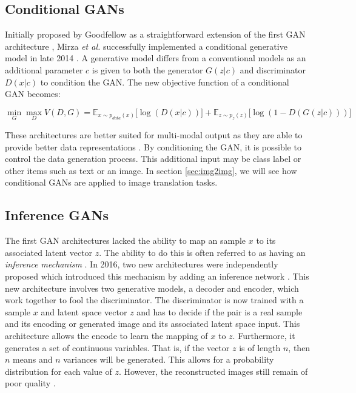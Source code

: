\documentclass[11pt]{article}
\begin{document}
\subsection{Conditional GANs} \label{sec:condgan}
Initially proposed by Goodfellow as a straightforward extension of the first GAN architecture \citep{2014arXiv1406.2661G}, Mirza \textit{et al.} successfully implemented a conditional generative model in late 2014 \citep{2014arXiv1411.1784M}. A generative model differs from a conventional models as an additional parameter $c$ is given to both the generator $G(z|c)$ and discriminator $D(x|c)$ to condition the GAN. The new objective function of a conditional GAN becomes:

$$\min_{G}\max_{D}V(D, G) = \mathbb{E}_{x\sim p_{data}(x)}\Big[\log(D(x|c))\Big] + \mathbb{E}_{z\sim p_z(z)}\Big[\log(1-D(G(z|c)))\Big]$$

These architectures are better suited for multi-modal output as they are able to provide better data representations \citep{2017arXiv171007035C}. By conditioning the GAN, it is possible to control the data generation process. This additional input may be class label or other items such as text or an image. In section \ref{sec:img2img}, we will see how conditional GANs are applied to image translation tasks.

\subsection{Inference GANs} \label{sec:inferencegan}
The first GAN architectures lacked the ability to map an sample $x$ to its associated latent vector $z$. The ability to do this is often referred to as having an \textit{inference mechanism} \citep{2017arXiv171007035C}. In 2016, two new architectures were independently proposed which introduced this mechanism by adding an inference network \citep{2016arXiv160509782D, 2016arXiv160600704D}. This new architecture involves two generative models, a decoder and encoder, which work together to fool the discriminator. The discriminator is now trained with a sample $x$ and latent space vector $z$ and has to decide if the pair is a real sample and its encoding or generated image and its associated latent space input. This architecture allows the encode to learn the mapping of $x$ to $z$. Furthermore, it generates a set of continuous variables. That is, if the vector $z$ is of length $n$, then $n$ means and $n$ variances will be generated. This allows for a probability distribution for each value of $z$. However, the reconstructed images still remain of poor quality \citep{2017arXiv171007035C}.
\end{document}
